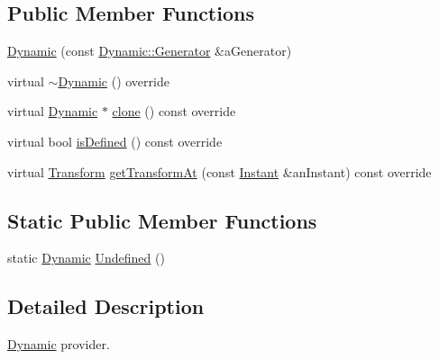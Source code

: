 \subsection*{Public Member Functions}
\begin{DoxyCompactItemize}
\item 
\hyperlink{classostk_1_1physics_1_1coord_1_1frame_1_1provider_1_1_dynamic_a4a2d8961bc1ed12a2eafdf0c099a254f}{Dynamic} (const \hyperlink{classostk_1_1physics_1_1coord_1_1frame_1_1provider_1_1_dynamic_a1627a4b4e00ddcb81b50d3cabec711e8}{Dynamic\+::\+Generator} \&a\+Generator)
\item 
virtual \hyperlink{classostk_1_1physics_1_1coord_1_1frame_1_1provider_1_1_dynamic_a0f2a46aa108cfd9116c2e3ce00071597}{$\sim$\+Dynamic} () override
\item 
virtual \hyperlink{classostk_1_1physics_1_1coord_1_1frame_1_1provider_1_1_dynamic}{Dynamic} $\ast$ \hyperlink{classostk_1_1physics_1_1coord_1_1frame_1_1provider_1_1_dynamic_a37623142581671606ea45ca3bda0d0c8}{clone} () const override
\item 
virtual bool \hyperlink{classostk_1_1physics_1_1coord_1_1frame_1_1provider_1_1_dynamic_ab01d8d9a09df8e46680eb1acb830a86c}{is\+Defined} () const override
\item 
virtual \hyperlink{classostk_1_1physics_1_1coord_1_1_transform}{Transform} \hyperlink{classostk_1_1physics_1_1coord_1_1frame_1_1provider_1_1_dynamic_a7b7bfc8957fd84d90d0479944a427005}{get\+Transform\+At} (const \hyperlink{classostk_1_1physics_1_1time_1_1_instant}{Instant} \&an\+Instant) const override
\end{DoxyCompactItemize}
\subsection*{Static Public Member Functions}
\begin{DoxyCompactItemize}
\item 
static \hyperlink{classostk_1_1physics_1_1coord_1_1frame_1_1provider_1_1_dynamic}{Dynamic} \hyperlink{classostk_1_1physics_1_1coord_1_1frame_1_1provider_1_1_dynamic_aee37346f8f67c537c87c490ecf48238c}{Undefined} ()
\end{DoxyCompactItemize}


\subsection{Detailed Description}
\hyperlink{classostk_1_1physics_1_1coord_1_1frame_1_1provider_1_1_dynamic}{Dynamic} provider. 

